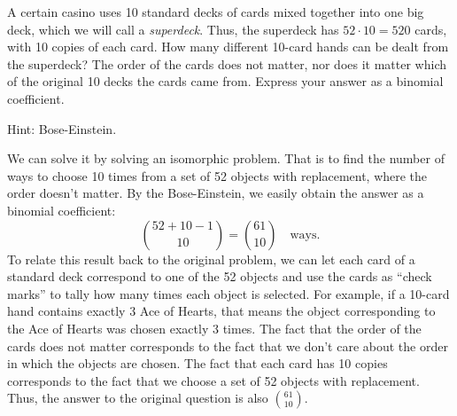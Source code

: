 {\begin{solution}
{        }
    \end{solution}
    \item %
    A certain casino uses 10 standard decks of cards mixed together into one big deck, which we will call a \textit{superdeck}. 
    Thus, the superdeck has $52 \cdot 10 = 520$ cards, with 10 copies of each card. 
    How many different 10-card hands can be dealt from the superdeck? 
    The order of the cards does not matter, nor does it matter which of the original 10 decks the cards came from. 
    Express your answer as a binomial coefficient. 

    Hint: Bose-Einstein. 
    \begin{solution}
        We can solve it by solving an isomorphic problem. 
        That is to find the number of ways to choose 10 times from a set of 52 objects with replacement, where the order doesn't matter. 
        By the Bose-Einstein, we easily obtain the answer as a binomial coefficient: 
        \begin{equation*}
            \binom{52 + 10 - 1}{10} = \binom{61}{10} \quad \text{ways}. 
        \end{equation*}
        To relate this result back to the original problem, we can let each card of a standard deck correspond to one of the 52 objects and use the cards as ``check marks'' to tally how many times each object is selected. 
        For example, if a 10-card hand contains exactly 3 Ace of Hearts, that means the object corresponding to the Ace of Hearts was chosen exactly 3 times. 
        The fact that the order of the cards does not matter corresponds to the fact that we don't care about the order in which the objects are chosen. 
        The fact that each card has 10 copies corresponds to the fact that we choose a set of 52 objects with replacement. 
        Thus, the answer to the original question is also $\binom{61}{10}$. 
    \end{solution}
    
    \item %
    \leavevmode
}
